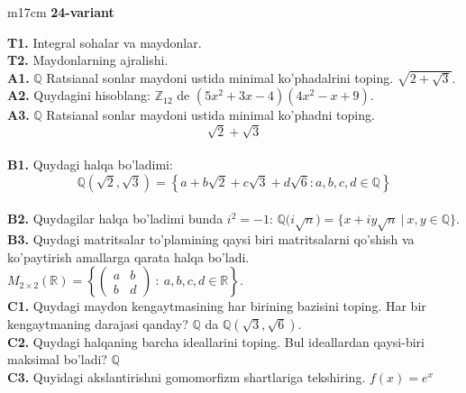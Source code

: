 \documentclass{article}
\begin{document}
\begin{tabular}{m{17cm}}
\textbf{24-variant}
\newline

\textbf{T1.} Integral sohalar va maydonlar. \\
\textbf{T2.} Maydonlarning ajralishi. \\
\textbf{A1.} \(\mathbb{Q}\) Ratsianal sonlar maydoni ustida minimal ko'phadalrini toping.
\(\sqrt{2 + \sqrt{3}}\). \\
\textbf{A2.} Quydagini hisoblang:
\(\mathbb{Z}_{12}\) de \(\left( 5x^{2} + 3x - 4 \right)\left( 4x^{2} - x + 9 \right)\). \\
\textbf{A3.} \(\mathbb{Q}\) Ratsianal sonlar maydoni ustida minimal ko'phadni toping.
\[\sqrt{2} + \sqrt{3}\] \\
\textbf{B1.} Quydagi halqa bo'ladimi:
\[\mathbb{Q}\left( \sqrt{2},\sqrt{3} \right) = \left\{ a + b\sqrt{2} + c\sqrt{3} + d\sqrt{6}:a,b,c,d \in \mathbb{Q} \right\}\] \\
\textbf{B2.} Quydagilar halqa bo'ladimi bunda \(i^{2} = - 1\):
\(\mathbb{Q(}i\sqrt{n}) = \{ x + iy\sqrt{n}\ |\ x,y \in \mathbb{Q\}}\). \\
\textbf{B3.} Quydagi matritsalar to'plamining qaysi biri matritsalarni qo'shish va ko'paytirish amallarga qarata halqa bo'ladi.
\(M_{2 \times 2}\mathbb{(R) =}\left\{ \begin{pmatrix}
a & b \\
b & d
\end{pmatrix}\ :\ a,b,c,d \in \mathbb{R} \right\}\). \\
\textbf{C1.} Quydagi maydon kengaytmasining har birining bazisini toping. Har bir kengaytmaning darajasi qanday?
\(\mathbb{Q}\) da \(\mathbb{Q}\left( \sqrt{3},\sqrt{6} \right)\). \\
\textbf{C2.} Quydagi halqaning barcha ideallarini toping. Bul ideallardan qaysi-biri maksimal bo'ladi? $\mathbb{Q}$ \\
\textbf{C3.} Quyidagi akslantirishni gomomorfizm shartlariga tekshiring. \(f(x) = e^{x}\) \\

\end{tabular}
\vspace{1cm}
\end{document}
